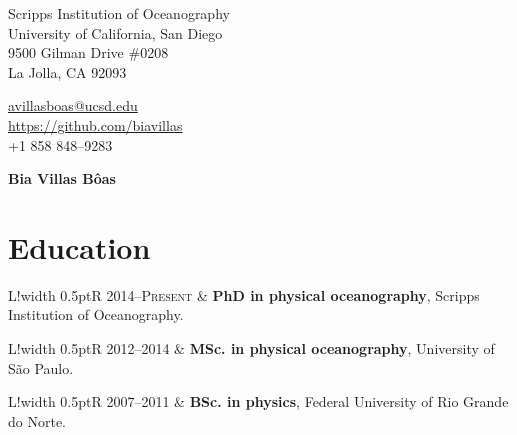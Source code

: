 \documentclass[10pt]{article}
\newcommand\VRule{\color{lightgray}\vrule width 0.5pt}
\begin{document}
\pagestyle{empty}
\begin{minipage}[ht]{0.48\textwidth}
\begin{flushleft}
\small{Scripps Institution of Oceanography} \\
\small{University of California, San Diego}\\
\small{9500 Gilman Drive \#0208} \\
\small{La Jolla, CA 92093} \\
\end{flushleft}
\end{minipage}
\hfill
\begin{minipage}[ht]{0.48\textwidth}
\begin{flushright}
\noindent \href{mailto:avillasboas@ucsd.edu}{avillasboas@ucsd.edu} \ \ \ \ \ \ \ \ \ \ \ \ \ \ \ \ \    \\
{\url{https://github.com/biavillas} }\\
\small{+1 858 848--9283} \ \ \ \ \ \ \ \ \ \ \ \ \ \ \ \ \  \ \ \ \ \ \ \ \ \ \   \\
\end{flushright}
\end{minipage}


\vspace{.5cm}
\begin{center}
	{\bfseries\Huge Bia Villas B\^{o}as}
\end{center}
\vspace{.5cm}

\section*{Education}
\vspace{.3cm}
\begin{tabular}{L!{\VRule}R}
\textsc{2014--Present} & \textbf{PhD in physical oceanography}, Scripps Institution of Oceanography. \\ 
\end{tabular}
\newline \noindent
\newline \noindent
\begin{tabular}{L!{\VRule}R}
\textsc{2012--2014} & \textbf{MSc. in physical oceanography}, University of São Paulo. \\ 
\end{tabular}
\newline \noindent
\newline \noindent
\begin{tabular}{L!{\VRule}R}
\textsc{2007--2011} & \textbf{BSc. in physics}, Federal University of Rio Grande do Norte. \\
\end{tabular}
\end{document}

